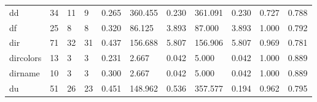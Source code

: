 \begin{longtable}{lp{1.2cm}p{1.2cm}p{1.2cm}p{1.2cm}p{1.2cm}p{1.2cm}p{1.2cm}p{1.2cm}p{1.2cm}p{1.2cm}}
dd        &                           34 &                 11 &                                 9 &                                      0.265 &                                360.455 &                                        0.230 &                           361.091 &                                   0.230 &                              0.727 &                                              0.788 \\
df        &                           25 &                  8 &                                 8 &                                      0.320 &                                 86.125 &                                        3.893 &                            87.000 &                                   3.893 &                              1.000 &                                              0.792 \\
dir       &                           71 &                 32 &                                31 &                                      0.437 &                                156.688 &                                        5.807 &                           156.906 &                                   5.807 &                              0.969 &                                              0.781 \\
dircolors &                           13 &                  3 &                                 3 &                                      0.231 &                                  2.667 &                                        0.042 &                             5.000 &                                   0.042 &                              1.000 &                                              0.889 \\
dirname   &                           10 &                  3 &                                 3 &                                      0.300 &                                  2.667 &                                        0.042 &                             5.000 &                                   0.042 &                              1.000 &                                              0.889 \\
du        &                           51 &                 26 &                                23 &                                      0.451 &                                148.962 &                                        0.536 &                           357.577 &                                   0.194 &                              0.962 &                                              0.795 \\

\end{longtable}
